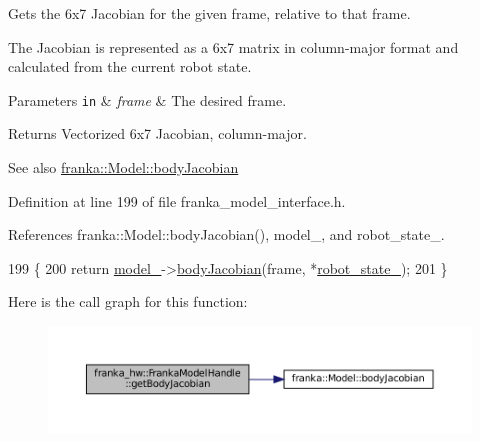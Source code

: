 Gets the 6x7 Jacobian for the given frame, relative to that frame.

The Jacobian is represented as a 6x7 matrix in column-\/major format and calculated from the current robot state.


\begin{DoxyParams}[1]{Parameters}
\mbox{\tt in}  & {\em frame} & The desired frame.\\
\hline
\end{DoxyParams}
\begin{DoxyReturn}{Returns}
Vectorized 6x7 Jacobian, column-\/major.
\end{DoxyReturn}
\begin{DoxySeeAlso}{See also}
\hyperlink{classfranka_1_1Model_af5525104e79cd6b8b05adbf83dc328c1}{franka\+::\+Model\+::body\+Jacobian} 
\end{DoxySeeAlso}


Definition at line 199 of file franka\+\_\+model\+\_\+interface.\+h.



References franka\+::\+Model\+::body\+Jacobian(), model\+\_\+, and robot\+\_\+state\+\_\+.


\begin{DoxyCode}
199                                                                        \{
200     \textcolor{keywordflow}{return} \hyperlink{classfranka__hw_1_1FrankaModelHandle_a0c47e6c735f1bd809581b0498d53349b}{model\_}->\hyperlink{classfranka_1_1Model_af5525104e79cd6b8b05adbf83dc328c1}{bodyJacobian}(frame, *\hyperlink{classfranka__hw_1_1FrankaModelHandle_a16192f263ce4709d99f557c6d8fabeb1}{robot\_state\_});
201   \}
\end{DoxyCode}
Here is the call graph for this function\+:
\nopagebreak
\begin{figure}[H]
\begin{center}
\leavevmode
\includegraphics[width=350pt]{classfranka__hw_1_1FrankaModelHandle_adc7a47e0c49ab6c15be950f3a41df8c8_cgraph}
\end{center}
\end{figure}
\mbox{\label{classfranka__hw_1_1FrankaModelHandle_a1b5ba63881c0dc365590c6e116576704}} 

